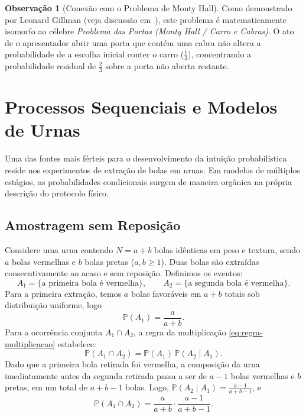 \documentclass[12pt,portuguese]{article}
\let\ge\geqslant
\theoremstyle{definition}
\newtheorem{remark}[remark]{Observação}
\begin{document}
\begin{remark}[Conexão com o Problema de Monty Hall]
Como demonstrado por Leonard Gillman (veja discussão em~\cite{Isaac1995}), este problema é matematicamente isomorfo ao célebre \emph{Problema das Portas (Monty Hall / Carro e Cabras)}. O ato de o apresentador abrir uma porta que contém uma cabra não altera a probabilidade de a escolha inicial conter o carro (\(\tfrac{1}{3}\)), concentrando a probabilidade residual de \(\tfrac{2}{3}\) sobre a porta não aberta restante.
\end{remark}

\section{Processos Sequenciais e Modelos de Urnas}
\label{sec:urnas-simetria}

Uma das fontes mais férteis para o desenvolvimento da intuição probabilística reside nos experimentos de extração de bolas em urnas. Em modelos de múltiplos estágios, as probabilidades condicionais surgem de maneira orgânica na própria descrição do protocolo físico.

\subsection{Amostragem sem Reposição}

Considere uma urna contendo \(N = a + b\) bolas idênticas em peso e textura, sendo \(a\) bolas vermelhas e \(b\) bolas pretas (\(a, b \ge 1\)). Duas bolas são extraídas consecutivamente ao acaso e sem reposição. Definimos os eventos:
\[
  A_1 = \{\text{a primeira bola é vermelha}\}, \qquad A_2 = \{\text{a segunda bola é vermelha}\}.
\]
Para a primeira extração, temos \(a\) bolas favoráveis em \(a+b\) totais sob distribuição uniforme, logo
\[
  \mathbb{P}(A_1) = \frac{a}{a+b}.
\]
Para a ocorrência conjunta \(A_1 \cap A_2\), a regra da multiplicação \eqref{eq:regra-multiplicacao} estabelece:
\[
  \mathbb{P}(A_1 \cap A_2) = \mathbb{P}(A_1)\,\mathbb{P}(A_2 \mid A_1).
\]
Dado que a primeira bola retirada foi vermelha, a composição da urna imediatamente antes da segunda retirada passa a ser de \(a-1\) bolas vermelhas e \(b\) pretas, em um total de \(a+b-1\) bolas. Logo, \(\mathbb{P}(A_2 \mid A_1) = \tfrac{a-1}{a+b-1}\), e
\[
  \mathbb{P}(A_1 \cap A_2) = \frac{a}{a+b} \cdot \frac{a-1}{a+b-1}.
\]
\end{document}
